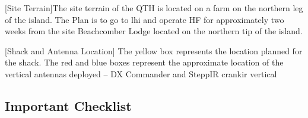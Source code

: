 \documentclass[11pt]{article}
\begin{document}
\vskip2mm
\noindent%
\begin{minipage}{\linewidth}%
\captionsetup{width=0.8\linewidth}
[Site Terrain]{The site terrain of the QTH is located
on a farm on the northern leg of the island.
The Plan is to go to {\gls{lhi}} and operate HF for approximately
two weeks from the site Beachcomber Lodge located on the northern
tip of the island.}
\label{farm}
\end{minipage}
\newpage
\vskip4mm

\noindent%
\begin{minipage}{\linewidth}%
\captionsetup{width=0.8\linewidth}
[Shack and Antenna Location]{
The yellow box represents the location planned for the shack.  The
red and blue boxes represent the approximate location of the vertical
antennas deployed -- DX Commander and SteppIR {\gls{crankir}} vertical}
\label{ant-farm}
\end{minipage}
\newpage
\vskip4mm

\subsection{Important Checklist}
\end{document}
